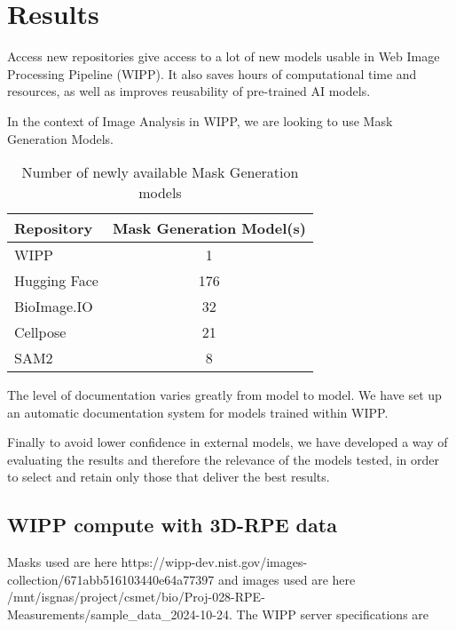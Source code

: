 \section{Results}
\label{sec:results}

Access new repositories give access to a lot of new models usable in Web Image
Processing Pipeline (WIPP). It also saves hours of computational time and
resources, as well as improves reusability of pre-trained AI models.

In the context of Image Analysis in WIPP, we are looking to use Mask
Generation Models.

\begin{table}[H]
\centering
\caption{\label{tab:number_of_newly_available_models}%
  Number of newly available Mask Generation models
}
\begin{tabular}{lc}
  \toprule
  Repository & Mask Generation Model(s) \\
  \midrule
  WIPP & 1 \\
  Hugging Face & 176 \\
  BioImage.IO & 32 \\
  Cellpose & 21 \\
  SAM2 & 8 \\
  \bottomrule
\end{tabular}
\end{table}

The level of documentation varies greatly from model to model. We have set up an
automatic documentation system for models trained within WIPP.

Finally to avoid lower confidence in external models, we have developed a way of
evaluating the results and therefore the relevance of the models tested, in
order to select and retain only those that deliver the best results.

\subsection{WIPP compute with 3D-RPE data}

Masks used are here
https://wipp-dev.nist.gov/images-collection/671abb516103440e64a77397 and images
used are here
/mnt/isgnas/project/csmet/bio/Proj-028-RPE-Measurements/sample\_data\_2024-10-24.
The WIPP server specifications are \TODO\

